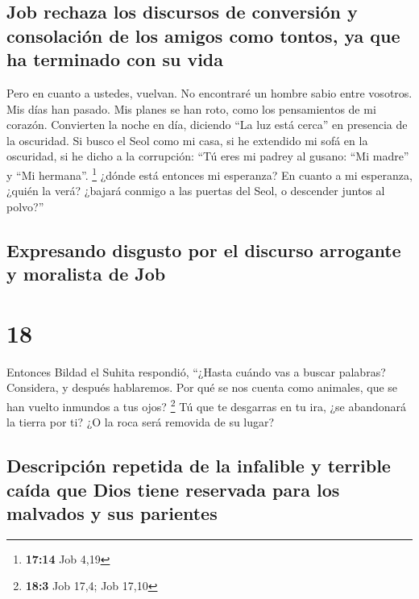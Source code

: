 \hypertarget{job-rechaza-los-discursos-de-conversiuxf3n-y-consolaciuxf3n-de-los-amigos-como-tontos-ya-que-ha-terminado-con-su-vida}{%
\subsection{Job rechaza los discursos de conversión y consolación de los
amigos como tontos, ya que ha terminado con su
vida}\label{job-rechaza-los-discursos-de-conversiuxf3n-y-consolaciuxf3n-de-los-amigos-como-tontos-ya-que-ha-terminado-con-su-vida}}

 Pero en cuanto a ustedes, vuelvan. No encontraré un
hombre sabio entre vosotros.  Mis días han pasado. Mis
planes se han roto, como los pensamientos de mi corazón. 
Convierten la noche en día, diciendo ``La luz está cerca'' en presencia
de la oscuridad.  Si busco el Seol como mi casa, si he
extendido mi sofá en la oscuridad,  si he dicho a la
corrupción: ``Tú eres mi padrey al gusano: ``Mi madre'' y ``Mi
hermana''. \footnote{\textbf{17:14} Job 4,19}  ¿dónde
está entonces mi esperanza? En cuanto a mi esperanza, ¿quién la verá?
 ¿bajará conmigo a las puertas del Seol, o descender
juntos al polvo?''

\hypertarget{expresando-disgusto-por-el-discurso-arrogante-y-moralista-de-job}{%
\subsection{Expresando disgusto por el discurso arrogante y moralista de
Job}\label{expresando-disgusto-por-el-discurso-arrogante-y-moralista-de-job}}

\hypertarget{section-17}{%
\section{18}\label{section-17}}

 Entonces Bildad el Suhita respondió, 
``¿Hasta cuándo vas a buscar palabras? Considera, y después hablaremos.
 Por qué se nos cuenta como animales, que se han vuelto
inmundos a tus ojos? \footnote{\textbf{18:3} Job 17,4; Job 17,10}
 Tú que te desgarras en tu ira, ¿se abandonará la tierra
por ti? ¿O la roca será removida de su lugar?

\hypertarget{descripciuxf3n-repetida-de-la-infalible-y-terrible-cauxedda-que-dios-tiene-reservada-para-los-malvados-y-sus-parientes}{%
\subsection{Descripción repetida de la infalible y terrible caída que
Dios tiene reservada para los malvados y sus
parientes}\label{descripciuxf3n-repetida-de-la-infalible-y-terrible-cauxedda-que-dios-tiene-reservada-para-los-malvados-y-sus-parientes}}

